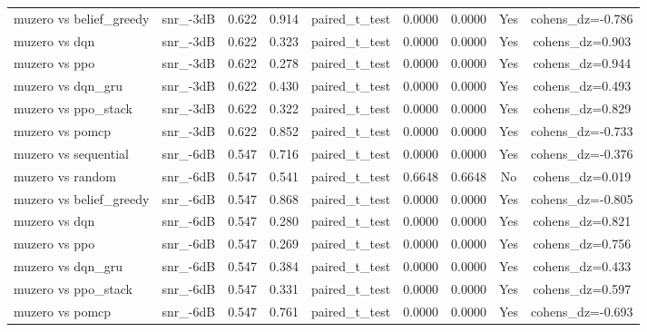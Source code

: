 \begin{table}[htbp]
\begin{tabular}{lcccccccc}
muzero vs belief_greedy & snr_-3dB & 0.622 & 0.914 & paired_t_test & 0.0000 & 0.0000 & Yes & cohens_dz=-0.786 \\
muzero vs dqn & snr_-3dB & 0.622 & 0.323 & paired_t_test & 0.0000 & 0.0000 & Yes & cohens_dz=0.903 \\
muzero vs ppo & snr_-3dB & 0.622 & 0.278 & paired_t_test & 0.0000 & 0.0000 & Yes & cohens_dz=0.944 \\
muzero vs dqn_gru & snr_-3dB & 0.622 & 0.430 & paired_t_test & 0.0000 & 0.0000 & Yes & cohens_dz=0.493 \\
muzero vs ppo_stack & snr_-3dB & 0.622 & 0.322 & paired_t_test & 0.0000 & 0.0000 & Yes & cohens_dz=0.829 \\
muzero vs pomcp & snr_-3dB & 0.622 & 0.852 & paired_t_test & 0.0000 & 0.0000 & Yes & cohens_dz=-0.733 \\
muzero vs sequential & snr_-6dB & 0.547 & 0.716 & paired_t_test & 0.0000 & 0.0000 & Yes & cohens_dz=-0.376 \\
muzero vs random & snr_-6dB & 0.547 & 0.541 & paired_t_test & 0.6648 & 0.6648 & No & cohens_dz=0.019 \\
muzero vs belief_greedy & snr_-6dB & 0.547 & 0.868 & paired_t_test & 0.0000 & 0.0000 & Yes & cohens_dz=-0.805 \\
muzero vs dqn & snr_-6dB & 0.547 & 0.280 & paired_t_test & 0.0000 & 0.0000 & Yes & cohens_dz=0.821 \\
muzero vs ppo & snr_-6dB & 0.547 & 0.269 & paired_t_test & 0.0000 & 0.0000 & Yes & cohens_dz=0.756 \\
muzero vs dqn_gru & snr_-6dB & 0.547 & 0.384 & paired_t_test & 0.0000 & 0.0000 & Yes & cohens_dz=0.433 \\
muzero vs ppo_stack & snr_-6dB & 0.547 & 0.331 & paired_t_test & 0.0000 & 0.0000 & Yes & cohens_dz=0.597 \\
muzero vs pomcp & snr_-6dB & 0.547 & 0.761 & paired_t_test & 0.0000 & 0.0000 & Yes & cohens_dz=-0.693 \\
\bottomrule
\end{tabular}
\end{table}
